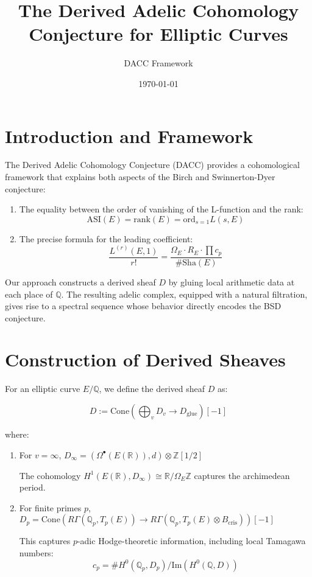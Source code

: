 \documentclass{article}
\title{The Derived Adelic Cohomology Conjecture for Elliptic Curves}
\author{DACC Framework}
\date{\today}
\begin{document}
\maketitle

\section{Introduction and Framework}

The Derived Adelic Cohomology Conjecture (DACC) provides a cohomological framework that explains
both aspects of the Birch and Swinnerton-Dyer conjecture:

\begin{enumerate}
    \item The equality between the order of vanishing of the L-function and the rank:
    \[ \text{ASI}(E) = \text{rank}(E) = \text{ord}_{s=1}L(s, E) \]

    \item The precise formula for the leading coefficient:
    \[ \frac{L^{(r)}(E,1)}{r!} = \frac{\Omega_E \cdot R_E \cdot \prod c_p}{\#\text{Sha}(E)} \]
\end{enumerate}

Our approach constructs a derived sheaf $D$ by gluing local arithmetic data at each place of $\mathbb{Q}$.
The resulting adelic complex, equipped with a natural filtration, gives rise to a spectral
sequence whose behavior directly encodes the BSD conjecture.

\section{Construction of Derived Sheaves}

For an elliptic curve $E/\mathbb{Q}$, we define the derived sheaf $D$ as:

\[ D := \text{Cone}\left(\bigoplus_v D_v \to D_{\text{glue}}\right)[-1] \]

where:

\begin{enumerate}
    \item For $v = \infty$, $D_\infty = (\Omega^\bullet(E(\mathbb{R})), d) \otimes \mathbb{Z}[1/2]$
    
    The cohomology $H^1(E(\mathbb{R}), D_\infty) \cong \mathbb{R}/\Omega_E \mathbb{Z}$ captures the archimedean period.

    \item For finite primes $p$, $D_p = \text{Cone}(R\Gamma(\mathbb{Q}_p, T_p(E)) \to R\Gamma(\mathbb{Q}_p, T_p(E) \otimes B_{\text{cris}}))[-1]$
    
    This captures $p$-adic Hodge-theoretic information, including local Tamagawa numbers:
    \[ c_p = \#H^0(\mathbb{Q}_p, D_p)/\text{Im}(H^0(\mathbb{Q}, D)) \]
\end{enumerate}
\end{document}
